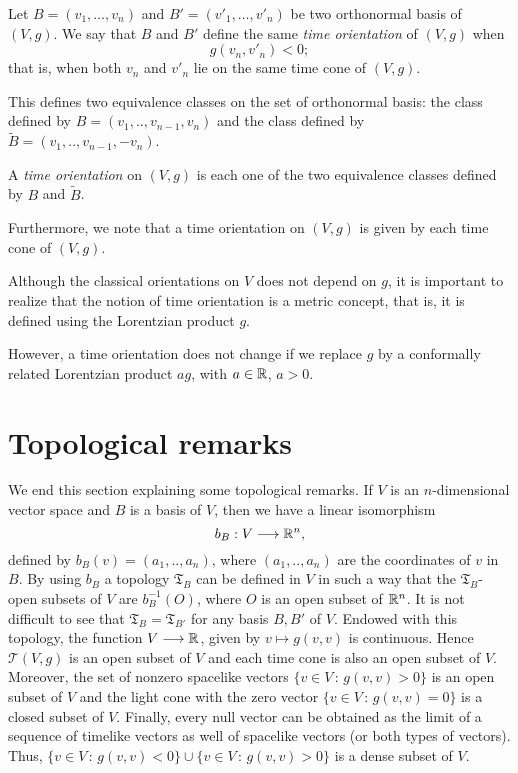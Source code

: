 Let $B = (v_1, \dots, v_n)$ and $B' = (v'_1, \dots, v'_n)$ be two orthonormal basis of $(V,g)$. We say that $B$ and $B'$ define the same \emph{time orientation} of $(V,g)$ when
\[
	g(v_n, v'_n) < 0;
\]
that is, when both $v_n$ and $v'_n$ lie on the same time cone of $(V,g)$.

This defines two equivalence classes on the set of orthonormal basis: the class defined by $B=(v_1,..,v_{n-1},v_n)$ and the class defined by $\tilde{B}=(v_1,..,v_{n-1},-v_n)$.

\begin{definition}
	A \emph{time orientation} on $(V,g)$ is each one of the two equivalence classes defined by $B$ and $\tilde{B}$.
\end{definition}

Furthermore, we note that a time orientation on $(V,g)$ is given by each time cone of $(V,g)$.

Although the classical orientations on $V$ does not depend on $g$, it is important to realize that the notion of time orientation is a metric concept, that is, it is defined using the Lorentzian product $g$.

However, a time orientation does not change if we replace $g$ by a conformally related Lorentzian product $ag$, with $a\in \mathbb{R}$, $a>0$.

\section{Topological remarks}

We end this section explaining some topological remarks. If $V$ is an $n$-dimensional vector space and $B$ is a basis of $V$, then we have a linear isomorphism $$b_B : V \longrightarrow \mathbb{R}^n,$$ defined by $b_B(v)=(a_1,..,a_n)$, where $(a_1,..,a_n)$ are the coordinates of $v$ in $B$. By using $b_B$ a topology $\mathfrak{T}_B$ can be defined in $V$ in such a way that the $\mathfrak{T}_B$-open subsets of $V$ are $b_B^{-1}(O)$, where $O$ is an open subset of $\mathbb{R}^n$. It is not difficult to see that $\mathfrak{T}_B = \mathfrak{T}_{B'}$ for any basis $B,B'$ of $V$. Endowed with this topology, the function $V \longrightarrow \mathbb{R}$, given by $v \mapsto g(v,v)$ is continuous. Hence $\mathcal{T}(V,g)$ is an open subset of $V$ and each time cone is also an open subset of $V$. Moreover, the set of nonzero spacelike vectors $\{v\in V \, : \, g(v,v)>0 \}$ is an open subset of $V$ and the light cone with the zero vector $\{v\in V \, : \, g(v,v)=0 \}$ is a closed subset of $V$. Finally, every null vector can be obtained as the limit of a sequence of timelike vectors as well of spacelike vectors (or both types of vectors). Thus, $\{v\in V \, : \, g(v,v)<0 \} \cup \{v\in V \, : \, g(v,v)>0 \}$
is a dense subset of $V$.
